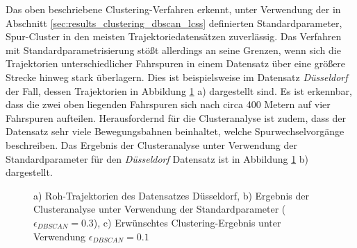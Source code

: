 Das oben beschriebene Clustering-Verfahren erkennt, unter Verwendung der in Abschnitt \ref{sec:results_clustering_dbscan_lcss}
definierten Standardparameter, Spur-Cluster in den meisten Trajektoriedatensätzen zuverlässig.
Das Verfahren mit Standardparametrisierung stößt allerdings an seine Grenzen, wenn sich die Trajektorien unterschiedlicher Fahrspuren
in einem Datensatz über eine größere Strecke hinweg stark überlagern. Dies ist beispielsweise im Datensatz
\textit{Düsseldorf} der Fall, dessen Trajektorien in Abbildung \ref{fig:real1_clusters_duesseldorf} a) dargestellt sind.
Es ist erkennbar, dass die zwei oben liegenden Fahrspuren sich nach circa 400 Metern auf vier Fahrspuren aufteilen.
Herausfordernd für die Clusteranalyse ist zudem, dass der Datensatz sehr viele Bewegungsbahnen beinhaltet,
welche Spurwechselvorgänge beschreiben.
Das Ergebnis der Clusteranalyse unter Verwendung der Standardparameter für den \textit{Düsseldorf} Datensatz ist
in Abbildung \ref{fig:real1_clusters_duesseldorf} b) dargestellt.

\begin{figure}[H]
    \centering
    \caption[Ergebnis Clusteranalyse Düsseldorf Datensatz]
            {a) Roh-Trajektorien des Datensatzes Düsseldorf, b) Ergebnis der Clusteranalyse unter Verwendung
            der Standardparameter ($\epsilon_{DBSCAN} = 0.3$), c) Erwünschtes Clustering-Ergebnis unter Verwendung $\epsilon_{DBSCAN} = 0.1$}
    \label{fig:real1_clusters_duesseldorf}
\end{figure}

